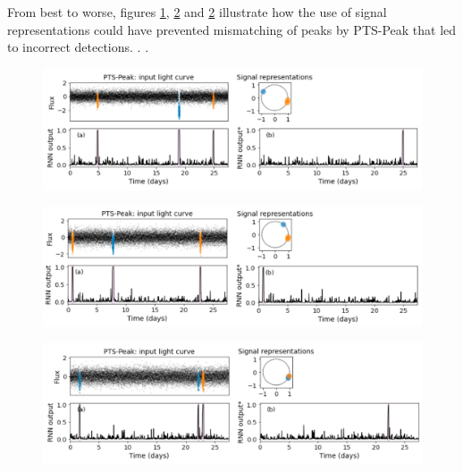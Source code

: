 From best to worse, figures \ref{fig:algorithm-repr1}, \ref{fig:algorithm-repr2} and \ref{fig:algorithm-repr2} illustrate how the use of signal representations could have prevented mismatching of peaks by PTS-Peak that led to incorrect detections. . .

\begin{figure}
    \centering
    \includegraphics[width=0.9\linewidth]{Experiments/Figures/Algorithm/repr1.png}
    \caption{}
    \label{fig:algorithm-repr1}
\end{figure}

\begin{figure}
    \centering
    \includegraphics[width=0.9\linewidth]{Experiments/Figures/Algorithm/repr2.png}
    \caption{}
    \label{fig:algorithm-repr2}
\end{figure}

\begin{figure}
    \centering
    \includegraphics[width=0.9\linewidth]{Experiments/Figures/Algorithm/repr3.png}
    \caption{}
    \label{fig:algorithm-repr3}
\end{figure}
